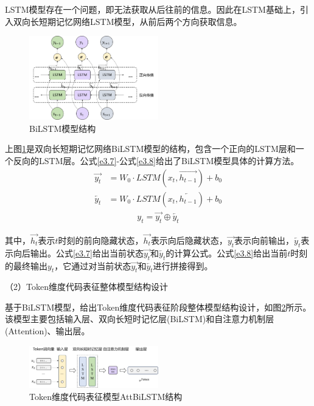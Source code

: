 LSTM模型存在一个问题，即无法获取从后往前的信息。因此在LSTM基础上，引入双向长短期记忆网络LSTM模型，从前后两个方向获取信息。

\begin{figure}[htp] 
  \centering
  \includegraphics[width=0.5\textwidth]{figures/BiLSTM}
  \caption{BiLSTM模型结构}\label{fig:BiLSTM}
\end{figure}

上图\ref{fig:BiLSTM}是双向长短期记忆网络BiLSTM模型的结构，包含一个正向的LSTM层和一个反向的LSTM层。公式\ref{e3.7}-公式\ref{e3.8}给出了BiLSTM模型具体的计算方法。
\begin{equation}\label{e3.7}
  \begin{split}
    \overrightarrow{y_t} &= W_0 \cdot LSTM\left(x_{t},\overrightarrow{h_{t-1}}\right) + b_0
    \\
    \overleftarrow{y_t} &= W_0 \cdot LSTM\left(x_{t},\overleftarrow{h_{t-1}}\right) + b_0
  \end{split}
\end{equation}
\begin{equation}\label{e3.8}
  \begin{split}
    y_t = \overrightarrow{y_t} \oplus\overleftarrow{y_t}
  \end{split}
\end{equation}

其中，$\overrightarrow{h_t}$表示$t$时刻的前向隐藏状态，$\overrightarrow{h_t}$表示向后隐藏状态，$\overrightarrow{y_t}$表示向前输出，$\overleftarrow{y_t}$表示向后输出。公式\ref{e3.7}给出当前状态$\overrightarrow{y_t}$和$\overleftarrow{y_t}$的计算公式。公式\ref{e3.8}给出当前$t$时刻的最终输出$y_t$，它通过对当前状态$\overrightarrow{y_t}$和$\overleftarrow{y_t}$进行拼接得到。

（2）Token维度代码表征整体模型结构设计

基于BiLSTM模型，给出Token维度代码表征阶段整体模型结构设计，如图\ref{fig:tokenmodel}所示。该模型主要包括输入层、双向长短时记忆层(BiLSTM)和自注意力机制层(Attention)、输出层。
\begin{figure}[htp]
  \centering
  \includegraphics[width=0.5\textwidth]{figures/tokenmodel}
  \caption{Token维度代码表征模型AttBiLSTM结构}\label{fig:tokenmodel}
\end{figure}

